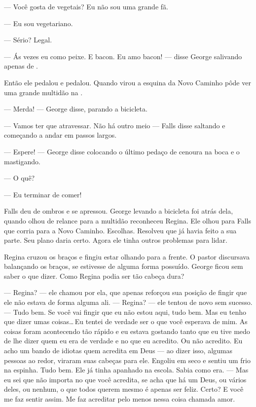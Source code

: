 --- Você gosta de vegetais? Eu não sou uma grande fã.

--- Eu sou vegetariano.

--- Sério? Legal.

--- Ás vezes eu como peixe. E bacon. Eu amo bacon! --- disse George\mudanca{,} salivando apenas de .

Então ele pedalou e pedalou. Quando virou a esquina da Novo Caminho\mudanca{,} pôde ver uma grande multidão na .

--- Merda! --- George disse, parando a bicicleta.

--- Vamos ter que atravessar. Não há outro meio --- Falls disse\mudanca{,} saltando e começando a andar em passos largos.

--- Espere! --- George disse\mudanca{,} colocando o último pedaço de cenoura na boca e o mastigando.

--- O quê?

--- Eu terminar de comer!

Falls deu de ombros e se apressou. George  levando a bicicleta foi atrás dela, quando olhou de relance para a multidão  reconheceu Regina. Ele olhou para Falls que corria para a Novo Caminho. Escolhas. Resolveu que já havia feito a sua parte. Seu plano daria certo. Agora ele tinha outros problemas para lidar.

Regina cruzou os braços e fingiu estar olhando para a frente. O pastor discursava balançando os braços,  se estivesse de alguma forma possuído. George ficou sem saber o que dizer. Como Regina podia ser tão cabeça dura?

--- Regina? --- ele chamou por ela, que apenas reforçou sua posição de fingir que ele não estava de forma alguma ali. --- Regina? --- ele tentou de novo\mudanca{,} sem sucesso. --- Tudo bem. Se você vai fingir que eu não estou aqui, tudo bem. Mas eu tenho que dizer umas coisas\ldots\,Eu tentei de verdade ser o que você esperava de mim. As coisas foram acontecendo tão rápido e eu estava gostando tanto que eu tive medo de lhe dizer quem eu era de verdade e no que eu acredito. Ou não acredito. Eu acho um bando de idiotas quem acredita em Deus --- ao dizer isso, algumas pessoas ao redor, viraram suas cabeças para ele. Engoliu em seco e sentiu um frio na espinha. Tudo bem. Ele já tinha apanhado na escola. Sabia como era. --- Mas eu sei que não importa no que você acredita, se acha que há um Deus, ou vários deles, ou nenhum, o que todos querem mesmo é apenas ser feliz. Certo? E você me faz sentir assim. Me faz acreditar pelo menos nessa coisa chamada amor.

